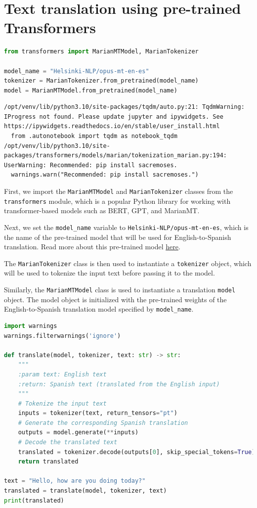 \section{Text translation using pre-trained
Transformers}\label{text-translation-using-pre-trained-transformers}

\begin{lstlisting}[language=Python]
from transformers import MarianMTModel, MarianTokenizer

model_name = "Helsinki-NLP/opus-mt-en-es"
tokenizer = MarianTokenizer.from_pretrained(model_name)
model = MarianMTModel.from_pretrained(model_name)
\end{lstlisting}

\begin{lstlisting}
/opt/venv/lib/python3.10/site-packages/tqdm/auto.py:21: TqdmWarning: IProgress not found. Please update jupyter and ipywidgets. See https://ipywidgets.readthedocs.io/en/stable/user_install.html
  from .autonotebook import tqdm as notebook_tqdm
/opt/venv/lib/python3.10/site-packages/transformers/models/marian/tokenization_marian.py:194: UserWarning: Recommended: pip install sacremoses.
  warnings.warn("Recommended: pip install sacremoses.")
\end{lstlisting}

First, we import the \lstinline{MarianMTModel} and
\lstinline{MarianTokenizer} classes from the
\lstinline{transformers} module, which is a popular Python
library for working with transformer-based models such as BERT, GPT, and
MarianMT.

Next, we set the \lstinline{model_name} variable to
\lstinline{Helsinki-NLP/opus-mt-en-es}, which is the name
of the pre-trained model that will be used for English-to-Spanish
translation. Read more about this pre-trained model
\href{https://huggingface.co/Helsinki-NLP/opus-mt-en-es}{here}.

The \lstinline{MarianTokenizer} class is then used to
instantiate a \lstinline{tokenizer} object, which will be
used to tokenize the input text before passing it to the model.

Similarly, the \lstinline{MarianMTModel} class is used to
instantiate a translation \lstinline{model} object. The
model object is initialized with the pre-trained weights of the
English-to-Spanish translation model specified by
\lstinline{model_name}.

\begin{lstlisting}[language=Python]
import warnings
warnings.filterwarnings('ignore')

def translate(model, tokenizer, text: str) -> str:
    """
    :param text: English text
    :return: Spanish text (translated from the English input)
    """
    # Tokenize the input text
    inputs = tokenizer(text, return_tensors="pt")
    # Generate the corresponding Spanish translation
    outputs = model.generate(**inputs)
    # Decode the translated text
    translated = tokenizer.decode(outputs[0], skip_special_tokens=True)
    return translated

text = "Hello, how are you doing today?"
translated = translate(model, tokenizer, text)
print(translated)
\end{lstlisting}

